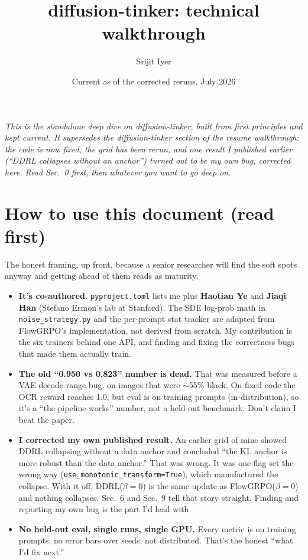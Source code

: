 \documentclass[11pt]{article}
\title{\vspace{-2.2em}\textbf{diffusion-tinker: technical walkthrough}}
\author{Srijit Iyer}
\date{Current as of the corrected reruns, July 2026}
\newcommand{\code}[1]{\texttt{\small #1}}
\begin{document}
\maketitle
\vspace{-1.2em}

\noindent\textit{This is the standalone deep dive on diffusion-tinker, built from
first principles and kept current. It supersedes the diffusion-tinker section of
the resume walkthrough: the code is now fixed, the grid has been rerun, and one
result I published earlier (``DDRL collapses without an anchor'') turned out to be
my own bug, corrected here. Read Sec.~0 first, then whatever you want to go deep on.}

\section{How to use this document (read first)}

The honest framing, up front, because a senior researcher will find the soft spots
anyway and getting ahead of them reads as maturity.

\begin{itemize}
\item \textbf{It's co-authored.} \code{pyproject.toml} lists me plus \textbf{Haotian Ye}
and \textbf{Jiaqi Han} (Stefano Ermon's lab at Stanford). The SDE log-prob math in
\code{noise\_strategy.py} and the per-prompt stat tracker are adapted from FlowGRPO's
implementation, not derived from scratch. My contribution is the six trainers behind
one API, and finding and fixing the correctness bugs that made them actually train.
\item \textbf{The old ``0.950 vs 0.823'' number is dead.} That was measured before a
VAE decode-range bug, on images that were $\sim$55\% black. On fixed code the OCR
reward reaches 1.0, but eval is on training prompts (in-distribution), so it's a
``the-pipeline-works'' number, not a held-out benchmark. Don't claim I beat the paper.
\item \textbf{I corrected my own published result.} An earlier grid of mine showed
DDRL collapsing without a data anchor and concluded ``the KL anchor is more robust
than the data anchor.'' That was wrong. It was one flag set the wrong way
(\code{use\_monotonic\_transform=True}), which manufactured the collapse. With it off,
DDRL($\beta{=}0$) is the same update as FlowGRPO($\beta{=}0$) and nothing collapses.
Sec.~6 and Sec.~9 tell that story straight. Finding and reporting my own bug is the
part I'd lead with.
\item \textbf{No held-out eval, single runs, single GPU.} Every metric is on training
prompts; no error bars over seeds; not distributed. That's the honest ``what I'd fix
next.''
\end{itemize}
\end{document}
